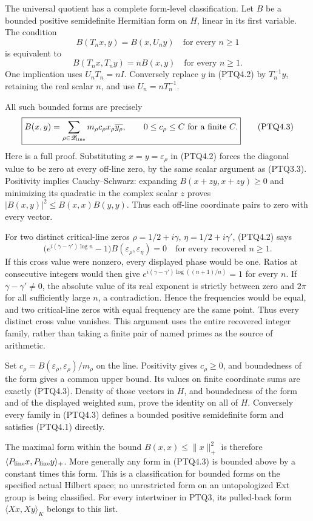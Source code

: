 The universal quotient has a complete form-level classification. Let
\(B\) be a bounded positive semidefinite Hermitian form on \(H\), linear
in its first variable. The condition \[
B(T_nx,y)=B(x,U_ny)\quad\text{for every }n\ge1
\tag{PTQ4.1}
\] is equivalent to \[
B(T_nx,T_ny)=nB(x,y)\quad\text{for every }n\ge1.
\tag{PTQ4.2}
\] One implication uses \(U_nT_n=nI\). Conversely replace \(y\) in
(PTQ4.2) by \(T_n^{-1}y\), retaining the real scalar \(n\), and use
\(U_n=nT_n^{-1}\).

All such bounded forms are precisely \[
\boxed{B(x,y)=\sum_{\rho\in\mathscr Z_{\rm line}}
m_\rho c_\rho x_\rho\overline{y_\rho},
\qquad 0\le c_\rho\le C\text{ for a finite }C.}
\tag{PTQ4.3}
\] Here is a full proof. Substituting \(x=y=\varepsilon_\rho\) in
(PTQ4.2) forces the diagonal value to be zero at every off-line zero, by
the same scalar argument as (PTQ3.3). Positivity implies
Cauchy--Schwarz: expanding \(B(x+zy,x+zy)\ge0\) and minimizing its
quadratic in the complex scalar \(z\) proves
\(|B(x,y)|^2\le B(x,x)B(y,y)\). Thus each off-line coordinate pairs to
zero with every vector.

For two distinct critical-line zeros \(\rho=1/2+i\gamma\),
\(\eta=1/2+i\gamma'\), (PTQ4.2) says \[
\bigl(e^{i(\gamma-\gamma')\log n}-1\bigr)
B(\varepsilon_\rho,\varepsilon_\eta)=0
\quad\text{for every recovered }n\ge1.
\tag{PTQ4.4}
\] If this cross value were nonzero, every displayed phase would be one.
Ratios at consecutive integers would then give
\(e^{i(\gamma-\gamma')\log((n+1)/n)}=1\) for every \(n\). If
\(\gamma-\gamma'\ne0\), the absolute value of its real exponent is
strictly between zero and \(2\pi\) for all sufficiently large \(n\), a
contradiction. Hence the frequencies would be equal, and two
critical-line zeros with equal frequency are the same point. Thus every
distinct cross value vanishes. This argument uses the entire recovered
integer family, rather than taking a finite pair of named primes as the
source of arithmetic.

Set \(c_\rho=B(\varepsilon_\rho,\varepsilon_\rho)/m_\rho\) on the line.
Positivity gives \(c_\rho\ge0\), and boundedness of the form gives a
common upper bound. Its values on finite coordinate sums are exactly
(PTQ4.3). Density of those vectors in \(H\), and boundedness of the form
and of the displayed weighted sum, prove the identity on all of \(H\).
Conversely every family in (PTQ4.3) defines a bounded positive
semidefinite form and satisfies (PTQ4.1) directly.

The maximal form within the bound \(B(x,x)\le\|x\|_+^2\) is therefore
\(\langle P_{\rm line}x,P_{\rm line}y\rangle_+\). More generally any
form in (PTQ4.3) is bounded above by a constant times this form. This is
a classification for bounded forms on the specified actual Hilbert
space; no unrestricted form on an untopologized Ext group is being
classified. For every intertwiner in PTQ3, its pulled-back form
\(\langle Xx,Xy\rangle_K\) belongs to this list.

